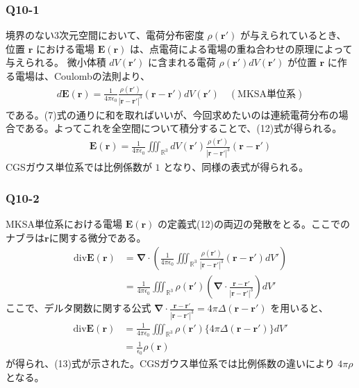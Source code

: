 \documentclass[platex,dvipdfmx,a4paper]{jsarticle}
\newcommand{\vect}[1]{\boldsymbol{#1}}
\begin{document}
  \subsubsection*{Q10-1}
  境界のない3次元空間において、電荷分布密度 $\rho(\vect{r'})$ が与えられているとき、位置 $\vect{r}$ における電場 $\vect{E}(\vect{r})$ は、点電荷による電場の重ね合わせの原理によって与えられる。
  微小体積 $dV(\vect{r'})$ に含まれる電荷 $\rho(\vect{r'})dV(\vect{r'})$ が位置 $\vect{r}$ に作る電場は、Coulombの法則より、
  \begin{align*}
    d\vect{E}(\vect{r}) = \frac{1}{4\pi\epsilon_0} \frac{\rho(\vect{r'})}{|\vect{r}-\vect{r'}|^3} (\vect{r}-\vect{r'}) dV(\vect{r'}) \quad (\text{MKSA単位系})
  \end{align*}
  である。(7)式の通りに和を取ればいいが、今回求めたいのは連続電荷分布の場合である。よってこれを全空間について積分することで、(12)式が得られる。
  \begin{align*}
    \vect{E}(\vect{r}) = \frac{1}{4\pi\epsilon_0} \iiint_{{\mathbb{R}^3}} dV(\vect{r'}) \frac{\rho(\vect{r'})}{|\vect{r}-\vect{r'}|^3} (\vect{r}-\vect{r'})
  \end{align*}
  CGSガウス単位系では比例係数が $1$ となり、同様の表式が得られる。


  \subsubsection*{Q10-2}
  MKSA単位系における電場 $\vect{E}(\vect{r})$ の定義式(12)の両辺の発散をとる。ここでのナブラは$\vect{r}$に関する微分である。
  \begin{align*}
    \text{div} \vect{E}(\vect{r}) &= \vect{\nabla} \cdot \left( \frac{1}{4\pi\epsilon_0} \iiint_{{\mathbb{R}^3}} \frac{\rho(\vect{r'})}{|\vect{r}-\vect{r'}|^3} (\vect{r}-\vect{r'}) dV' \right) \\
    &= \frac{1}{4\pi\epsilon_0} \iiint_{{\mathbb{R}^3}} \rho(\vect{r'}) \left( \vect{\nabla} \cdot \frac{\vect{r}-\vect{r'}}{|\vect{r}-\vect{r'}|^3} \right) dV'
  \end{align*}
  ここで、デルタ関数に関する公式 $\vect{\nabla} \cdot \frac{\vect{r}-\vect{r'}}{|\vect{r}-\vect{r'}|^3} = 4\pi \Delta(\vect{r}-\vect{r'})$ を用いると、
  \begin{align*}
    \text{div} \vect{E}(\vect{r}) &= \frac{1}{4\pi\epsilon_0} \iiint_{{\mathbb{R}^3}} \rho(\vect{r'}) \{ 4\pi \Delta(\vect{r}-\vect{r'}) \} dV' \\
    &= \frac{1}{\epsilon_0} \rho(\vect{r})
  \end{align*}
  が得られ、(13)式が示された。CGSガウス単位系では比例係数の違いにより $4\pi\rho$ となる。
\end{document}
